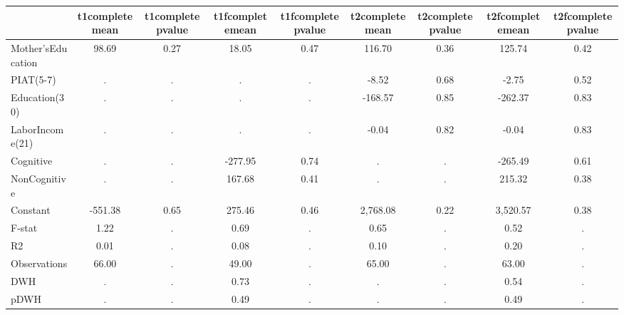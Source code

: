 \begin{table}[htbp]
\begin{tabular}{lcccccccc} \hline \hline
 & t1completemean  & t1completepvalue  & t1fcompletemean  & t1fcompletepvalue  & t2completemean  & t2completepvalue  & t2fcompletemean  & t2fcompletepvalue  \\  \hline 
Mother'sEducation &        98.69 &         0.27 &        18.05 &         0.47 &       116.70 &         0.36 &       125.74 &         0.42 \\  
PIAT(5-7) &            . &            . &            . &            . &        -8.52 &         0.68 &        -2.75 &         0.52 \\  
Education(30) &            . &            . &            . &            . &      -168.57 &         0.85 &      -262.37 &         0.83 \\  
LaborIncome(21) &            . &            . &            . &            . &        -0.04 &         0.82 &        -0.04 &         0.83 \\  
Cognitive &            . &            . &      -277.95 &         0.74 &            . &            . &      -265.49 &         0.61 \\  
NonCognitive &            . &            . &       167.68 &         0.41 &            . &            . &       215.32 &         0.38 \\  
Constant &      -551.38 &         0.65 &       275.46 &         0.46 &     2,768.08 &         0.22 &     3,520.57 &         0.38 \\  
F-stat &         1.22 &            . &         0.69 &            . &         0.65 &            . &         0.52 &            . \\  
R2 &         0.01 &            . &         0.08 &            . &         0.10 &            . &         0.20 &            . \\  
Observations &        66.00 &            . &        49.00 &            . &        65.00 &            . &        63.00 &            . \\  
DWH &            . &            . &         0.73 &            . &            . &            . &         0.54 &            . \\  
pDWH &            . &            . &         0.49 &            . &            . &            . &         0.49 &            . \\  
\hline \hline \end{tabular}
\end{table}

